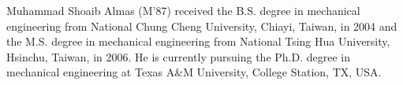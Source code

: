 \documentclass{ieeeaccess}
\begin{document}
\begin{IEEEbiography}{Muhammad Shoaib Almas} (M'87) received the B.S. degree in mechanical 
engineering from National Chung Cheng University, Chiayi, Taiwan, in 2004 
and the M.S. degree in mechanical engineering from National Tsing Hua 
University, Hsinchu, Taiwan, in 2006. He is currently pursuing the Ph.D. 
degree in mechanical engineering at Texas A{\&}M University, College 
Station, TX, USA.

\end{IEEEbiography}

\EOD
\end{document}
